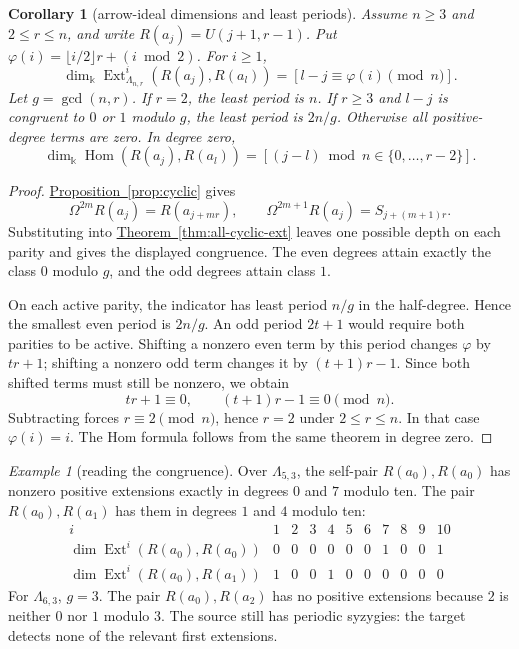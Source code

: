 \documentclass[reqno]{amsart}
\numberwithin{equation}{section}
\newtheorem{corollary}[theorem]{Corollary}
\theoremstyle{definition}
\theoremstyle{remark}
\newtheorem{example}[theorem]{Example}
\DeclareMathOperator{\Hom}{Hom}
\DeclareMathOperator{\Ext}{Ext}
\newcommand{\Om}{\Omega}
\newcommand{\kk}{\Bbbk}
\newcommand{\kdim}{\dim_{\kk}}
\newcommand{\propref}[1]{\hyperref[#1]{Proposition~\ref*{#1}}}
\newcommand{\thmref}[1]{\hyperref[#1]{Theorem~\ref*{#1}}}
\begin{document}
\begin{corollary}[arrow-ideal dimensions and least periods]\label{thm:cyclic-ext}
Assume \(n\ge3\) and \(2\le r\le n\), and write \(R(a_j)=U(j+1,r-1)\). Put \(\varphi(i)=\lfloor i/2\rfloor r+(i\bmod2)\). For \(i\ge1\),
\[
 \kdim\Ext_{\Lambda_{n,r}}^i(R(a_j),R(a_l))
   =[l-j\equiv\varphi(i)\pmod n].
\]
Let \(g=\gcd(n,r)\). If \(r=2\), the least period is \(n\). If \(r\ge3\) and \(l-j\) is congruent to \(0\) or \(1\) modulo \(g\), the least period is \(2n/g\). Otherwise all positive-degree terms are zero. In degree zero,
\[
 \kdim\Hom(R(a_j),R(a_l))
   =[(j-l)\bmod n\in\{0,\ldots,r-2\}].
\]
\end{corollary}
\begin{proof}
\propref{prop:cyclic} gives
\[
 \Om^{2m}R(a_j)=R(a_{j+mr}),\qquad
 \Om^{2m+1}R(a_j)=S_{j+(m+1)r}.
\]
Substituting into \thmref{thm:all-cyclic-ext} leaves one possible depth on each parity and gives the displayed congruence. The even degrees attain exactly the class \(0\) modulo \(g\), and the odd degrees attain class \(1\).

On each active parity, the indicator has least period \(n/g\) in the half-degree. Hence the smallest even period is \(2n/g\). An odd period \(2t+1\) would require both parities to be active. Shifting a nonzero even term by this period changes \(\varphi\) by \(tr+1\); shifting a nonzero odd term changes it by \((t+1)r-1\). Since both shifted terms must still be nonzero, we obtain
\[
tr+1\equiv0,\qquad (t+1)r-1\equiv0\pmod n.
\]
Subtracting forces \(r\equiv2\pmod n\), hence \(r=2\) under \(2\le r\le n\). In that case \(\varphi(i)=i\). The Hom formula follows from the same theorem in degree zero.
\end{proof}

\begin{example}[reading the congruence]
Over \(\Lambda_{5,3}\), the self-pair \(R(a_0),R(a_0)\) has nonzero positive extensions exactly in degrees \(0\) and \(7\) modulo ten. The pair \(R(a_0),R(a_1)\) has them in degrees \(1\) and \(4\) modulo ten:
\[
\begin{array}{c|rrrrrrrrrr}
i&1&2&3&4&5&6&7&8&9&10\\ \hline
\dim\Ext^i(R(a_0),R(a_0))&0&0&0&0&0&0&1&0&0&1\\
\dim\Ext^i(R(a_0),R(a_1))&1&0&0&1&0&0&0&0&0&0
\end{array}
\]
For \(\Lambda_{6,3}\), \(g=3\). The pair \(R(a_0),R(a_2)\) has no positive extensions because \(2\) is neither \(0\) nor \(1\) modulo \(3\). The source still has periodic syzygies: the target detects none of the relevant first extensions.
\end{example}
\end{document}
